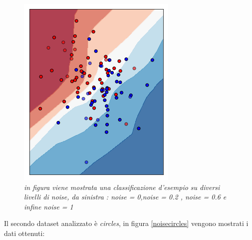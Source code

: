 \documentclass[12pt,a4paper]{report}
\begin{document}
\begin{figure}[H]
 \includegraphics[scale = 0.35]{images/moons-noise1}
 \caption{\textit{in figura viene mostrata una classificazione d'esempio su diversi livelli di noise, da sinistra : noise = 0,noise = 0.2 , noise = 0.6 e infine noise = 1}}
 \label{exnoisemoons}
\end{figure}

\newpage

Il secondo dataset analizzato è \textit{circles}, in figura \ref{noisecircles} vengono mostrati i dati ottenuti:
\end{document}
